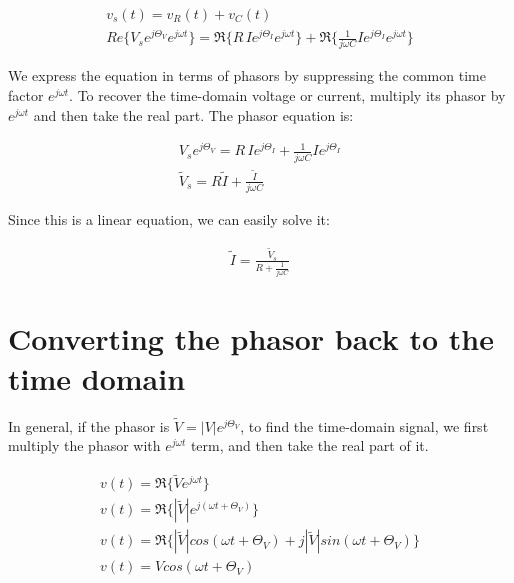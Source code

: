 \documentclass{ximera}
\begin{document}
\begin{eqnarray}
v_s(t)=v_R(t) + v_C(t)  \\
Re\{V_s e^{j \Theta_V} e^{j \omega t}\}=    \Re\{R \, I e^{j \Theta_I} e^{j \omega t}\}   +  \Re\{   \frac{1}{j \omega C}  I e^{j \Theta_I}  e^{j \omega t}  \}
\end{eqnarray}

We express the equation in terms of phasors by suppressing
the common time factor $e^{j\omega t}$.
To recover the time-domain voltage or current, multiply
its phasor by $e^{j\omega t}$ and then take the real part.
The phasor equation is:




\begin{eqnarray}
 V_s  e^{j \Theta_{V}}  =R \, I e^{j \Theta_I}  +    \frac{1}{j \omega C}  I e^{j \Theta_I}  \\
\tilde{V}_s  = R \tilde{I}    + \frac{\tilde{I}}{j \omega C} 
\end{eqnarray}



Since this is a linear equation, we can easily solve it:


\begin{eqnarray}
\tilde{I}  = \frac{\tilde{V}_s}{ R    + \frac{1}{j \omega C} } \label{pheq}
\end{eqnarray} 




\section{Converting the phasor back to the time domain}


In general, if the phasor is  $\tilde{V}=|V| e^{j \Theta_V}$, to find the time-domain signal, we first multiply the phasor with $e^{j \omega t}$ term, and then take the real part of it. 

\begin{eqnarray}
v(t)=\Re \{ \tilde{V} e^{j \omega t} \} \\
v(t)=\Re\{|\tilde{V}| e^{j(\omega t + \Theta_V)}\} \\
v(t)=\Re\{ |\tilde{V}| cos (\omega t + \Theta_V ) + j  |\tilde{V}|  sin (\omega t + \Theta_V)\} \\
v(t) = V cos (\omega t + \Theta_V )
\end{eqnarray}
\end{document}
